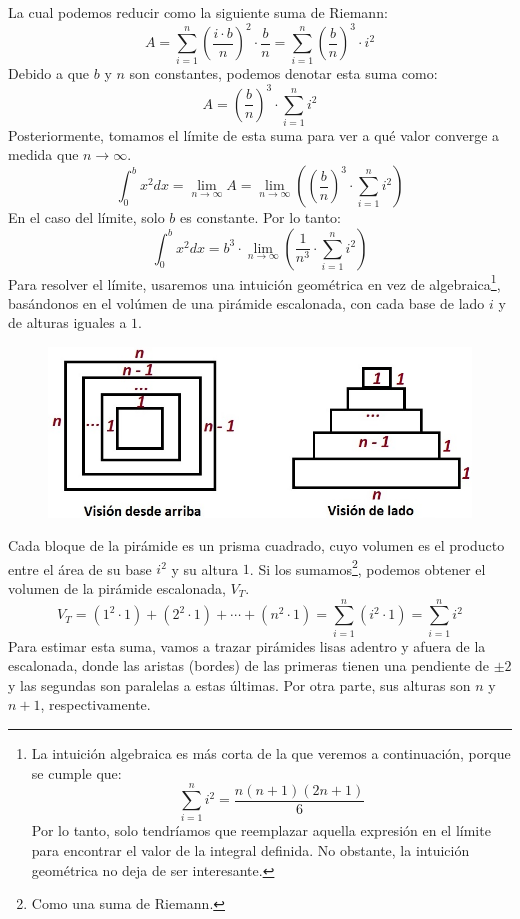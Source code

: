 \documentclass[12pt]{article}
\begin{document}
La cual podemos reducir como la siguiente suma de Riemann:
\[
  A = \sum_{i = 1}^{n} \left(\frac{i \cdot b}{n}\right)^{2} \cdot \frac{b}{n}
    = \sum_{i = 1}^{n} \left(\frac{b}{n}\right)^{3} \cdot i^{2}
\]
Debido a que $b$ y $n$ son constantes, podemos denotar esta suma como:
\[
  A = \left(\frac{b}{n}\right)^{3} \cdot \sum_{i = 1}^{n} i^{2}
\]
Posteriormente, tomamos el límite de esta suma para ver a qué valor converge a medida que $n \to \infty$.
\[
  \int_{0}^{b} x^{2} dx = \lim_{n \to \infty} A
                        = \lim_{n \to \infty} \left(\left(\frac{b}{n}\right)^{3} \cdot \sum_{i = 1}^{n} i^{2}\right)
\]
En el caso del límite, solo $b$ es constante. Por lo tanto:
\[
  \int_{0}^{b} x^{2} dx = b^{3} \cdot \lim_{n \to \infty} \left(\frac{1}{n^{3}} \cdot \sum_{i = 1}^{n} i^{2}\right)
\]
Para resolver el límite, usaremos una intuición geométrica en vez de algebraica\footnote{La intuición algebraica es más corta de la que veremos a continuación, porque se cumple que:\[\sum_{i = 1}^{n} i^{2} = \frac{n(n+1)(2n+1)}{6}\]Por lo tanto, solo tendríamos que reemplazar aquella expresión en el límite para encontrar el valor de la integral definida. No obstante, la intuición geométrica no deja de ser interesante.}, basándonos en el volúmen de una pirámide escalonada, con cada base de lado $i$ y de alturas iguales a $1$.

\begin{figure}[hbt!]
\centering
\includegraphics[scale=0.4]{img/riemann-pyramid.jpg}
\end{figure}

Cada bloque de la pirámide es un prisma cuadrado, cuyo volumen es el producto entre el área de su base $i^{2}$ y su altura $1$. Si los sumamos\footnote{Como una suma de Riemann.}, podemos obtener el volumen de la pirámide escalonada, $V_{T}$.
\[
  V_{T} = (1^{2} \cdot 1) + (2^{2} \cdot 1) + \cdots + (n^{2} \cdot 1)
        = \sum_{i = 1}^{n} (i^{2} \cdot 1)
        = \sum_{i = 1}^{n} i^{2}
\]
Para estimar esta suma, vamos a trazar pirámides lisas adentro y afuera de la escalonada, donde las aristas (bordes) de las primeras tienen una pendiente de $\pm 2$ y las segundas son paralelas a estas últimas. Por otra parte, sus alturas son $n$ y $n + 1$, respectivamente.
\end{document}
